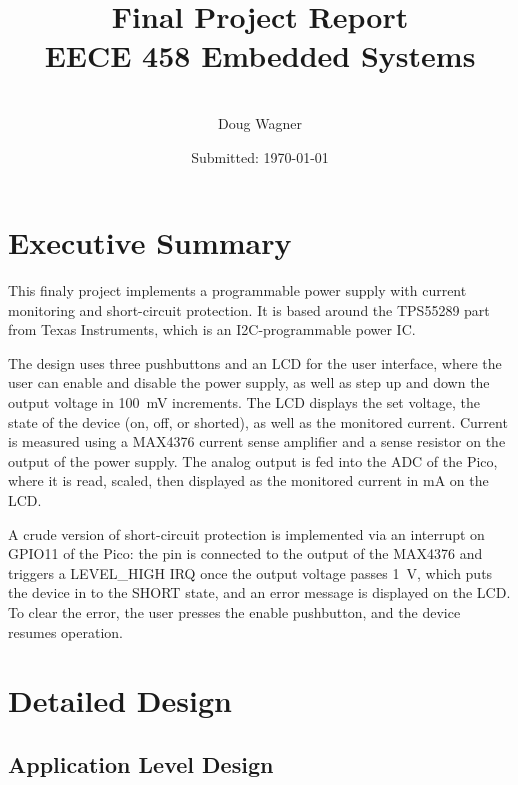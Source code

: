 \documentclass[12pt]{article}
\title{Final Project Report \\ EECE 458 Embedded Systems}
\author{\\ Doug Wagner}
\date{Submitted: \today }
\numberwithin{figure}{section}
\numberwithin{equation}{section}
\begin{document}
\maketitle 
\newpage

\tableofcontents 
\newpage 

\section{Executive Summary}

This finaly project implements a programmable power supply with current monitoring and short-circuit protection.  It is based around the TPS55289 part from Texas Instruments, which is an I2C-programmable power IC.  

The design uses three pushbuttons and an LCD for the user interface, where the user can enable and disable the power supply, as well as step up and down the output voltage in \SI{100}{\milli\volt} increments.  The LCD displays the set voltage, the state of the device (on, off, or shorted), as well as the monitored current. Current is measured using a MAX4376 current sense amplifier and a sense resistor on the output of the power supply. The analog output is fed into the ADC of the Pico, where it is read, scaled, then displayed as the monitored current in \si{\milli\ampere} on the LCD.

A crude version of short-circuit protection is implemented via an interrupt on GPIO11 of the Pico: the pin is connected to the output of the MAX4376 and triggers a LEVEL\_HIGH IRQ once the output voltage passes \SI{1}{\volt}, which puts the device in to the SHORT state, and an error message is displayed on the LCD.  To clear the error, the user presses the enable pushbutton, and the device resumes operation.

\section{Detailed Design} 
\subsection{Application Level Design}
\end{document}
